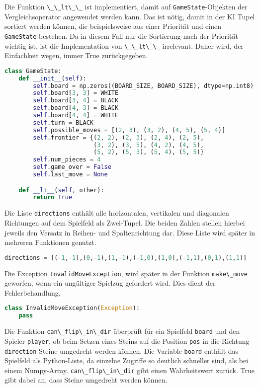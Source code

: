 Die Funktion \passthrough{\lstinline!\_\_lt\_\_!} ist implementiert,
damit auf \passthrough{\lstinline!GameState!}-Objekten der
Vergleichsoperator angewendet werden kann. Das ist nötig, damit in der
\ac{KI} Tupel sortiert werden können, die beispielsweise aus einer
Priorität und einen \passthrough{\lstinline!GameState!} bestehen. Da in
diesem Fall nur die Sortierung nach der Priorität wichtig ist, ist die
Implementation von \passthrough{\lstinline!\_\_lt\_\_!} irrelevant.
Daher wird, der Einfachkeit wegen, immer True zurückgegeben.

\begin{lstlisting}[language=Python]
class GameState:
    def __init__(self):
        self.board = np.zeros((BOARD_SIZE, BOARD_SIZE), dtype=np.int8)
        self.board[3, 3] = WHITE
        self.board[3, 4] = BLACK
        self.board[4, 3] = BLACK
        self.board[4, 4] = WHITE
        self.turn = BLACK
        self.possible_moves = [(2, 3), (3, 2), (4, 5), (5, 4)]
        self.frontier = {(2, 2), (2, 3), (2, 4), (2, 5),
                         (3, 2), (3, 5), (4, 2), (4, 5),
                         (5, 2), (5, 3), (5, 4), (5, 5)}
        self.num_pieces = 4
        self.game_over = False
        self.last_move = None

    def __lt__(self, other):
        return True
\end{lstlisting}

Die Liste \passthrough{\lstinline!directions!} enthält alle
horizontalen, vertikalen und diagonalen Richtungen auf dem Spielfeld als
Zwei-Tupel. Die beiden Zahlen stellen hierbei jeweils den Versatz in
Reihen- und Spaltenrichtung dar. Diese Liste wird später in mehreren
Funktionen genutzt.

\begin{lstlisting}[language=Python]
directions = [(-1,-1),(0,-1),(1,-1),(-1,0),(1,0),(-1,1),(0,1),(1,1)]
\end{lstlisting}

Die Exception \passthrough{\lstinline!InvalidMoveException!}, wird
später in der Funktion \passthrough{\lstinline!make\_move!} geworfen,
wenn ein ungültiger Spielzug gefordert wird. Dies dient der
Fehlerbehandlung.

\begin{lstlisting}[language=Python]
class InvalidMoveException(Exception):
    pass
\end{lstlisting}

Die Funktion \passthrough{\lstinline!can\_flip\_in\_dir!} überprüft für
ein Spielfeld \passthrough{\lstinline!board!} und den Spieler
\passthrough{\lstinline!player!}, ob beim Setzen eines Steins auf die
Position \passthrough{\lstinline!pos!} in die Richtung
\passthrough{\lstinline!direction!} Steine umgedreht werden können. Die
Variable \passthrough{\lstinline!board!} enthält das Spielfeld als
Python-Liste, da einzelne Zugriffe so deutlich schneller sind, als bei
einem Numpy-Array. \passthrough{\lstinline!can\_flip\_in\_dir!} gibt
einen Wahrheitswert zurück. True gibt dabei an, dass Steine umgedreht
werden können.

